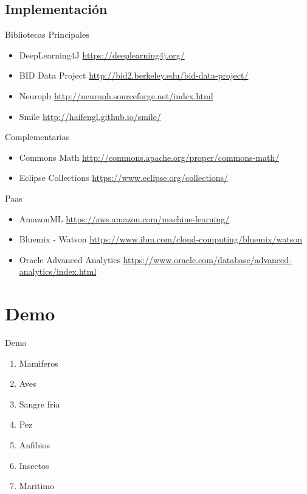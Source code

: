 \documentclass{beamer}
\begin{document}
\subsection{Implementación}
\begin{frame}{Bibliotecas}
    Principales
    \begin{itemize}
        \item DeepLearning4J \url{https://deeplearning4j.org/}
        \item BID Data Project \url{http://bid2.berkeley.edu/bid-data-project/}
        \item Neuroph \url{http://neuroph.sourceforge.net/index.html}
                \item Smile \url{http://haifengl.github.io/smile/}
    \end{itemize}

    Complementarias
    \begin{itemize}
        \item Commons Math \url{http://commons.apache.org/proper/commons-math/}
        \item Eclipse Collections \url{https://www.eclipse.org/collections/}
    \end{itemize}
\end{frame}

\begin{frame}{Paas}
    \begin{itemize}
        \item AmazonML \url{https://aws.amazon.com/machine-learning/}
        \item Bluemix - Watson \url{https://www.ibm.com/cloud-computing/bluemix/watson}
        \item Oracle Advanced Analytics \url{https://www.oracle.com/database/advanced-analytics/index.html}
    \end{itemize}
\end{frame}


\section{Demo}
\begin{frame}{Demo}
    \begin{enumerate}
        \item Mamiferos
        \item Aves
        \item Sangre fria
        \item Pez
        \item Anfibios
        \item Insectos
        \item Maritimo
    \end{enumerate}
\end{frame}
\end{document}

